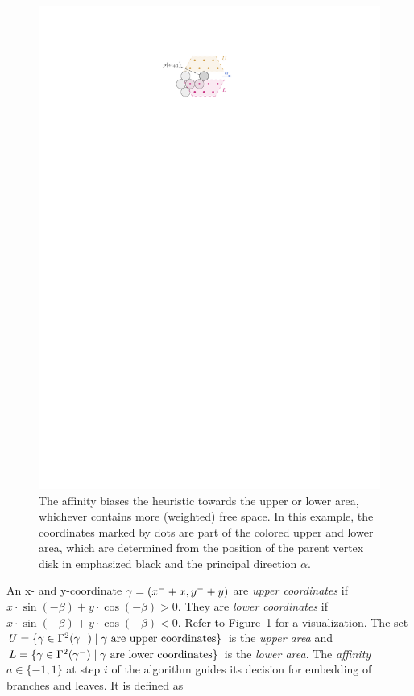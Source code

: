 \begin{figure}
    \centering
    \includegraphics{graphics/ch5_affinity.pdf}
    \caption[Affinity]{The affinity biases the heuristic towards the upper or lower area, whichever contains more (weighted) free space. In this example, the coordinates marked by dots are part of the colored upper and lower area, which are determined from the position of the parent vertex disk in emphasized black and the principal direction $\alpha$.}
    \label{fig:ch5-affinity}
\end{figure}

An x- and y-coordinate $\gamma = (x^- + x, y^- + y)$ are \emph{upper coordinates} if $x \cdot \sin (-\beta) + y \cdot \cos (-\beta) > 0$. They are \emph{lower coordinates} if $x \cdot \sin (-\beta) + y \cdot \cos (-\beta) < 0$. Refer to  Figure~\ref{fig:ch5-affinity} for a visualization.
The set $U = \{ \gamma \in \Gamma^2(\gamma^-) \mid \gamma \text{ are upper coordinates} \}$ is the \emph{upper area} and $L = \{ \gamma \in \Gamma^2(\gamma^-) \mid \gamma \text{ are lower coordinates} \}$ is the \emph{lower area}.
The \emph{affinity} $a \in \{-1, 1\}$ at step $i$ of the algorithm guides its decision for embedding of branches and leaves. It is defined as

